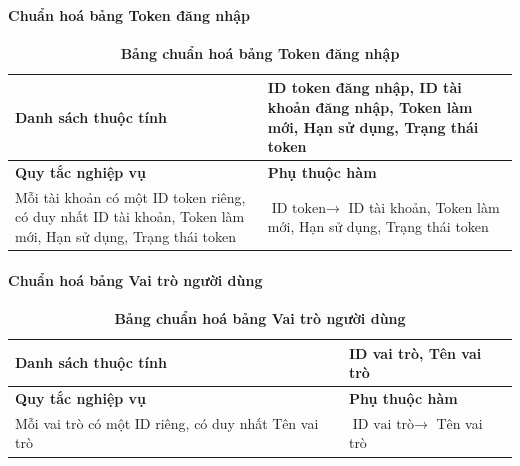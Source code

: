 \paragraph{Chuẩn hoá bảng Token đăng nhập}
\mbox{}
\begin{table}[H]
	\caption{\bfseries \fontsize{12pt}{0pt}\selectfont Bảng chuẩn hoá bảng Token đăng nhập}
	\centering
	\begin{tabularx}{0.9\textwidth}{|X|X|}
		\hline
		\textbf{Danh sách thuộc tính} & ID token đăng nhập, ID tài khoản đăng nhập, Token làm mới, Hạn sử dụng, Trạng thái token                         \\
		\hline
		\textbf{Quy tắc nghiệp vụ}    & \textbf{Phụ thuộc hàm}                                                                                           \\
		\hline
		Mỗi tài khoản có một ID token riêng, có duy nhất ID tài khoản, Token làm mới, Hạn sử dụng, Trạng thái token
		                              & \parbox[t]{\linewidth}{$\text{ID token} \rightarrow$ ID tài khoản, Token làm mới, Hạn sử dụng, Trạng thái token} \\
		\hline
		                                                               \\
		                                                                         \\
		\hline
	\end{tabularx}
\end{table}

\paragraph{Chuẩn hoá bảng Vai trò người dùng}
\mbox{}
\begin{table}[H]
	\caption{\bfseries \fontsize{12pt}{0pt}\selectfont Bảng chuẩn hoá bảng Vai trò người dùng}
	\centering
	\begin{tabularx}{0.9\textwidth}{|X|X|}
		\hline
		\textbf{Danh sách thuộc tính} & ID vai trò, Tên vai trò                                             \\
		\hline
		\textbf{Quy tắc nghiệp vụ}    & \textbf{Phụ thuộc hàm}                                              \\
		\hline
		Mỗi vai trò có một ID riêng, có duy nhất Tên vai trò
		                              & \parbox[t]{\linewidth}{$\text{ID vai trò} \rightarrow$ Tên vai trò} \\
		\hline
		                          \\
		                         \\
		\hline
	\end{tabularx}
\end{table}

